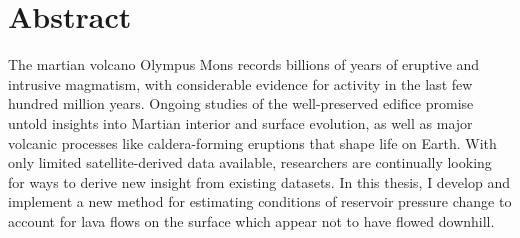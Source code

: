 \chapter{Abstract}
The martian volcano Olympus Mons records billions of years of eruptive and intrusive magmatism, with considerable evidence for activity in the last few hundred million years. Ongoing studies of the well-preserved edifice promise untold insights into Martian interior and surface evolution, as well as major volcanic processes like caldera-forming eruptions that shape life on Earth. With only limited satellite-derived data available, researchers are continually looking for ways to derive new insight from existing datasets. In this thesis, I develop and implement a new method for estimating conditions of reservoir pressure change to account for lava flows on the surface which appear not to have flowed downhill.